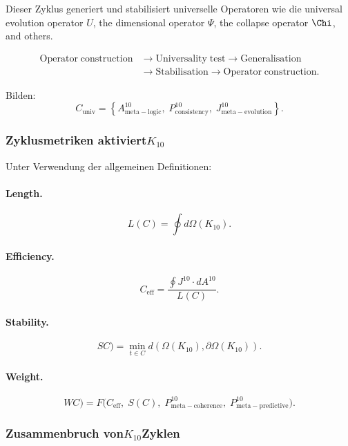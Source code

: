 Dieser Zyklus generiert und stabilisiert universelle Operatoren wie die
universal evolution operator $U$, the dimensional operator $\Psi$, the
collapse operator $\Chi$, and others.

\[
  \begin{aligned}
  \mathrm{Operator\;construction}
  &\to \mathrm{Universality\;test}
  \to \mathrm{Generalisation}\\
  &\to \mathrm{Stabilisation}
  \to \mathrm{Operator\;construction}.
  \end{aligned}
\]

Bilden:
\[
  C_{\mathrm{univ}}
  =
  \left\{
    A^{10}_{\mathrm{meta\!-\!logic}},\;
    P^{10}_{\mathrm{consistency}},\;
    J^{10}_{\mathrm{meta\!-\!evolution}}
  \right\}.
\]


\subsubsection{Zyklusmetriken aktiviert$K_{10}$}

Unter Verwendung der allgemeinen Definitionen:

\paragraph{Length.}
\[
  L(C) = \oint d\Omega(K_{10}).
\]

\paragraph{Efficiency.}
\[
  C_{\mathrm{eff}} =
  \frac{\oint J^{10}\cdot dA^{10}}{L(C)}.
\]

\paragraph{Stability.}
\[
SC)
   = \min_{t\in C}
     d(\Omega(K_{10}), \partial\Omega(K_{10})).
\]

\paragraph{Weight.}
\[
WC)
    = F\big(
        C_{\mathrm{eff}},\;
        S(C),\;
        P^{10}_{\mathrm{meta\!-\!coherence}},\;
        P^{10}_{\mathrm{meta\!-\!predictive}}
      \big).
\]


\subsubsection{Zusammenbruch von$K_{10}$Zyklen}

